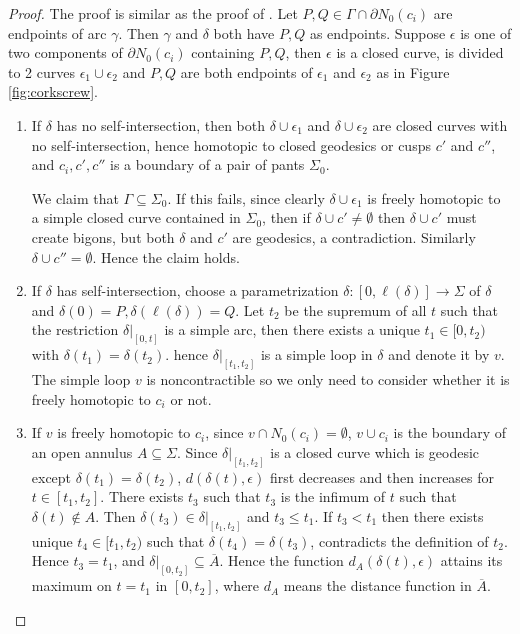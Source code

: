 \documentclass[11pt, a4paper]{article}
\theoremstyle{definition}
\theoremstyle{remark}
\begin{document}
\begin{proof}


  The proof is similar as the proof of \cite[Theorem 1.1(2)]{Y2801}. Let $P,Q\in\Gamma\cap\partial N_0(c_i)$ are endpoints of arc $\gamma$. Then $\gamma$ and $\delta$ both have $P,Q$ as endpoints. Suppose $\epsilon$ is one of two components of $\partial N_0(c_i)$ containing $P,Q$, then $\epsilon$ is a closed curve, is divided to 2 curves $\epsilon_1\cup\epsilon_2$ and $P,Q$ are both endpoints of $\epsilon_1$ and $\epsilon_2$ as in Figure \ref{fig:corkscrew}.

\begin{enumerate}
\item

If $\delta$ has no self-intersection, then both $\delta\cup\epsilon_1$ and $\delta\cup\epsilon_2$ are closed curves with no self-intersection, hence homotopic to closed geodesics or cusps $c'$ and $c''$, and $c_i,c',c''$ is a boundary of a pair of pants $\Sigma_0$. 

We claim that $\Gamma\subseteq\Sigma_0$. If this fails, since clearly $\delta\cup\epsilon_1$ is freely homotopic to a simple closed curve contained in $\Sigma_0$, then if $\delta\cup c'\neq\emptyset$ then $\delta\cup c'$ must create bigons, but both $\delta$ and $c'$ are geodesics, a contradiction. Similarly $\delta\cup c''=\emptyset$. Hence the claim holds.

\item
If $\delta$ has self-intersection, choose a parametrization $\delta:[0,\ell(\delta)]\rightarrow\Sigma$ of $\delta$ and $\delta(0)=P,\delta(\ell(\delta))=Q$. Let $t_2$ be the supremum of all $t$ such that the restriction $\delta|_{[0,t]}$ is a simple arc, then there exists a unique $t_1\in[0,t_2)$ with $\delta(t_1)=\delta(t_2)$. hence $\delta|_{[t_1,t_2]}$ is a simple loop in $\delta$ and denote it by $v$. The simple loop $v$ is noncontractible so we only need to consider whether it is freely homotopic to $c_i$ or not.


\item
If $v$ is freely homotopic to $c_i$, since $v\cap N_0(c_i)=\emptyset$, $v\cup c_i$ is the boundary of an open annulus $A\subseteq\Sigma$. Since $\delta|_{[t_1,t_2]}$ is a closed curve which is geodesic except $\delta(t_1)=\delta(t_2)$, $d(\delta(t),\epsilon)$ first decreases and then increases for $t\in[t_1,t_2]$. There exists $t_3$ such that $t_3$ is the infimum of $t$ such that $\delta(t)\notin A$. Then $\delta(t_3)\in\delta|_{[t_1,t_2]}$ and $t_3\leqslant t_1$. If $t_3<t_1$ then there exists unique $t_4\in[t_1,t_2)$ such that $\delta(t_4)=\delta(t_3)$, contradicts the definition of $t_2$. Hence $t_3=t_1$, and $\delta|_{[0,t_2]}\subseteq\overline{A}$. Hence the function $d_A(\delta(t),\epsilon)$ attains its maximum on $t=t_1$ in $[0,t_2]$, where $d_A$ means the distance function in $\overline{A}$. 


\end{enumerate}
\end{proof}
\end{document}
